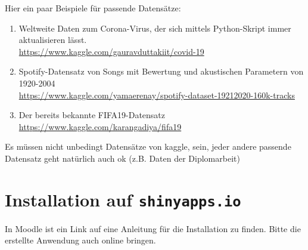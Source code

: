 \documentclass{article}
\begin{document}
Hier ein paar Beispiele für passende Datensätze:

\begin{enumerate}
	\item Weltweite Daten zum Corona-Virus, der sich mittels Python-Skript immer aktualisieren lässt. \\ \url{https://www.kaggle.com/gauravduttakiit/covid-19}
	\item Spotify-Datensatz von Songs mit Bewertung und akustischen Parametern von 1920-2004 \\
	\url{https://www.kaggle.com/yamaerenay/spotify-dataset-19212020-160k-tracks} 
	\item Der bereits bekannte FIFA19-Datensatz \\
	\url{https://www.kaggle.com/karangadiya/fifa19}
\end{enumerate}

Es müssen nicht unbedingt Datensätze von kaggle, sein, jeder andere passende Datensatz geht natürlich auch ok (z.B. Daten der Diplomarbeit)

\section{Installation auf \texttt{shinyapps.io}}

In Moodle ist ein Link auf eine Anleitung für die Installation zu finden. Bitte die erstellte Anwendung auch online bringen.
\end{document}
